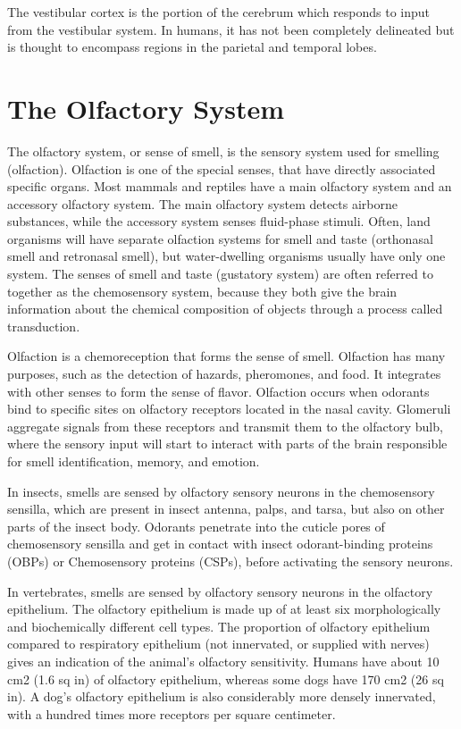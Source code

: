 The vestibular cortex is the portion of the cerebrum which responds to input from the vestibular system. In humans, it has not been completely delineated but is thought to encompass regions in the parietal and temporal lobes.

\hypertarget{the-olfactory-system}{%
\chapter{The Olfactory System}\label{the-olfactory-system}}

The olfactory system, or sense of smell, is the sensory system used for smelling (olfaction). Olfaction is one of the special senses, that have directly associated specific organs. Most mammals and reptiles have a main olfactory system and an accessory olfactory system. The main olfactory system detects airborne substances, while the accessory system senses fluid-phase stimuli. Often, land organisms will have separate olfaction systems for smell and taste (orthonasal smell and retronasal smell), but water-dwelling organisms usually have only one system. The senses of smell and taste (gustatory system) are often referred to together as the chemosensory system, because they both give the brain information about the chemical composition of objects through a process called transduction.

Olfaction is a chemoreception that forms the sense of smell. Olfaction has many purposes, such as the detection of hazards, pheromones, and food. It integrates with other senses to form the sense of flavor. Olfaction occurs when odorants bind to specific sites on olfactory receptors located in the nasal cavity. Glomeruli aggregate signals from these receptors and transmit them to the olfactory bulb, where the sensory input will start to interact with parts of the brain responsible for smell identification, memory, and emotion.

In insects, smells are sensed by olfactory sensory neurons in the chemosensory sensilla, which are present in insect antenna, palps, and tarsa, but also on other parts of the insect body. Odorants penetrate into the cuticle pores of chemosensory sensilla and get in contact with insect odorant-binding proteins (OBPs) or Chemosensory proteins (CSPs), before activating the sensory neurons.

In vertebrates, smells are sensed by olfactory sensory neurons in the olfactory epithelium. The olfactory epithelium is made up of at least six morphologically and biochemically different cell types. The proportion of olfactory epithelium compared to respiratory epithelium (not innervated, or supplied with nerves) gives an indication of the animal's olfactory sensitivity. Humans have about 10 cm2 (1.6 sq in) of olfactory epithelium, whereas some dogs have 170 cm2 (26 sq in). A dog's olfactory epithelium is also considerably more densely innervated, with a hundred times more receptors per square centimeter.

